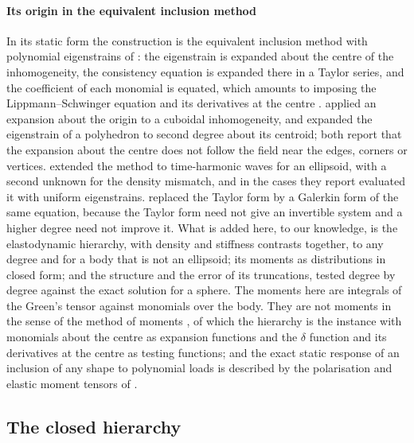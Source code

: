 \documentclass[preprint,review,12pt]{elsarticle}
\begin{document}
\paragraph{Its origin in the equivalent inclusion method} In its static form the construction is the
equivalent inclusion method with polynomial eigenstrains of \citet{Moschovidis1975}: the eigenstrain
is expanded about the centre of the inhomogeneity, the consistency equation is expanded there in a
Taylor series, and the coefficient of each monomial is equated, which amounts to imposing the
Lippmann--Schwinger equation and its derivatives at the centre \citep[\S2.2]{Brisard2014}.
\citet{Johnson1980a,Johnson1980b} applied an expansion about the origin to a cuboidal
inhomogeneity, and \citet{WuZhangYin2021} expanded the eigenstrain of a polyhedron to second degree
about its centroid; both report that the expansion about the centre does not follow the field near the
edges, corners or vertices. \citet{FuMura1983} extended the method to time-harmonic waves for an
ellipsoid, with a second unknown for the density mismatch, and in the cases they report evaluated it
with uniform eigenstrains. \citet{Brisard2014} replaced the Taylor form by a Galerkin form of the same
equation, because the Taylor form need not give an invertible system and a higher degree need not
improve it. What is added here, to our knowledge, is the elastodynamic hierarchy, with density and
stiffness contrasts together, to any degree and for a body that is not an ellipsoid; its moments as
distributions in closed form; and the structure and the error of its truncations, tested degree by
degree against the exact solution for a sphere. The moments here are integrals of the Green's tensor
against monomials over the body. They are not moments in the sense of the method of moments
\citep{Harrington1993}, of which the hierarchy is the instance with monomials about the centre as
expansion functions and the $\delta$ function and its derivatives at the centre as testing functions;
and the exact static response of an inclusion of any shape to polynomial loads is described by the
polarisation and elastic moment tensors of \citet{AmmariKang2007}.

\subsection{The closed hierarchy}\label{sec:hierarchy}
\end{document}
